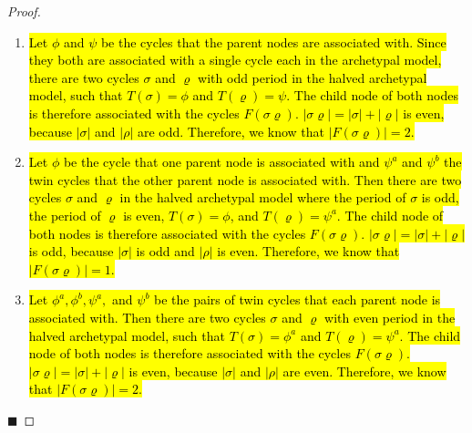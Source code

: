 \begin{proof} \phantom{x}
	\begin{enumerate}
		\item
		      \hl{
			      Let $\phi$ and $\psi$ be the cycles that the parent nodes are associated with.
			      Since they both are associated with a single cycle each in the archetypal model, there are two cycles $\sigma$ and $\varrho$ with odd period in the halved archetypal model, such that $T(\sigma) = \phi$ and $T(\varrho) = \psi$.
			      The child node of both nodes is therefore associated with the cycles $F(\sigma\varrho)$.
			      $|\sigma\varrho| = |\sigma| + |\varrho|$ is even, because $|\sigma|$ and $|\rho|$ are odd.
			      Therefore, we know that $\left|F(\sigma\varrho)\right| = 2$.
		      }
		\item
		      \hl{
			      Let $\phi$ be the cycle that one parent node is associated with and $\psi^a$ and $\psi^b$ the twin cycles that the other parent node is associated with.
			      Then there are two cycles $\sigma$ and $\varrho$ in the halved archetypal model where the period of $\sigma$ is odd, the period of $\varrho$ is even, $T(\sigma) = \phi$, and $T(\varrho) = \psi^a$.
			      The child node of both nodes is therefore associated with the cycles $F(\sigma\varrho)$.
			      $|\sigma\varrho| = |\sigma| + |\varrho|$ is odd, because $|\sigma|$ is odd and $|\rho|$ is even.
			      Therefore, we know that $\left|F(\sigma\varrho)\right| = 1$.
		      }
		\item
		      \hl{
			      Let $\phi^a, \phi^b, \psi^a,$ and $\psi^b$ be the pairs of twin cycles that each parent node is associated with.
			      Then there are two cycles $\sigma$ and $\varrho$ with even period in the halved archetypal model, such that $T(\sigma) = \phi^a$ and $T(\varrho) = \psi^a$.
			      The child node of both nodes is therefore associated with the cycles $F(\sigma\varrho)$.
			      $|\sigma\varrho| = |\sigma| + |\varrho|$ is even, because $|\sigma|$ and $|\rho|$ are even.
			      Therefore, we know that $\left|F(\sigma\varrho)\right| = 2$.
		      }
	\end{enumerate}
	\hfill $\blacksquare$
\end{proof}

